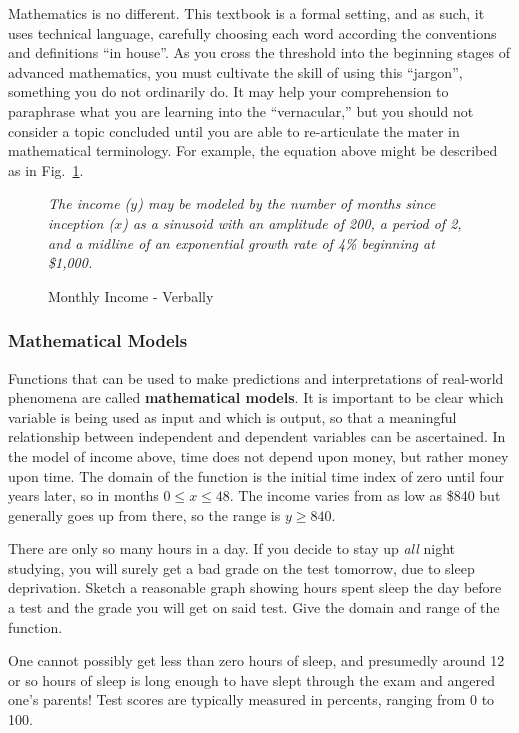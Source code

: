 Mathematics is no different.  This textbook is a formal setting, and as such, 
it uses technical language, carefully
choosing each word according the conventions and definitions ``in house''.  
As you cross the threshold into the
beginning stages of advanced mathematics, you must cultivate the skill of 
using this ``jargon'', something you 
do not ordinarily do.  It may help your comprehension to paraphrase 
what you are learning into the ``vernacular,''
but you should not consider a topic concluded until you are able to 
re-articulate the mater in mathematical terminology.
For example, the equation above might be described as in Fig.~\ref{fig:verbally}.

\begin{figure}
\emph{The income ($y$) may be modeled by the number of months since 
inception ($x$) as a sinusoid with an amplitude of 200, a period of 2, and a
midline of an exponential growth rate of 4\% beginning at \$1,000.}
\caption{Monthly Income - Verbally\label{fig:verbally}}
\end{figure}

\subsubsection{Mathematical Models}
Functions that can be used to make predictions and 
interpretations of real-world phenomena are called \textbf{mathematical
models}.
It is important to be clear which variable is being used as input 
and which is output, so that a meaningful
relationship between independent and dependent variables 
can be ascertained.  In the model of income above,
time does not depend upon money, but rather money upon time.  
The domain of the function is the initial time
index of zero until four years later, so in months $0\le x \le 48$.  
The income varies from as low as \$840 but
generally goes up from there, so the range is $y\ge840$.

\begin{example}
	\exProblem
There are only so many hours in a day.  If you decide to stay up \emph{all} night studying, 
you will surely get
a bad grade on the test tomorrow, due to sleep deprivation.  
Sketch a reasonable graph showing hours spent sleep the day before
a test and the grade you will get on said test.  Give the domain and range of the function.

	\exSolution
One cannot possibly get less than zero hours of sleep, and presumedly around 
12 or so hours of sleep is
long enough to have slept through the exam and angered one's parents!  
Test scores are typically measured in percents, ranging from 0 to 100.

\end{example}

~\vfill